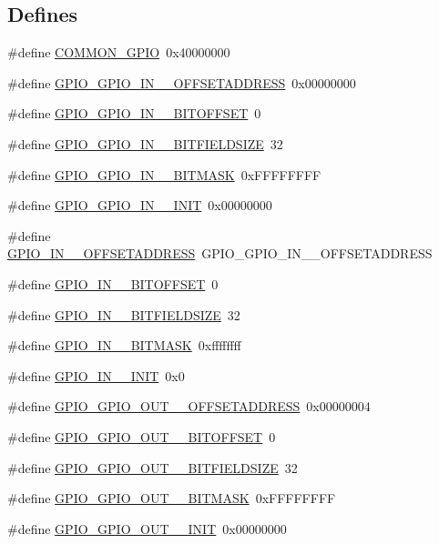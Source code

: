 \subsection*{Defines}
\begin{DoxyCompactItemize}
\item 
\#define \hyperlink{a00553_aacfc134a5216df66d88112b4198b522e}{COMMON\_\-GPIO}~0x40000000
\item 
\#define \hyperlink{a00553_a2e767a84839acf27464ae4a3d6c10e04}{GPIO\_\-GPIO\_\-IN\_\_\-OFFSETADDRESS}~0x00000000
\item 
\#define \hyperlink{a00553_ab8c7701a197c66b2717665c99fe1f8e2}{GPIO\_\-GPIO\_\-IN\_\_\-BITOFFSET}~0
\item 
\#define \hyperlink{a00553_aaaa37fd5f23b4c1d173c7b6ac3ca3895}{GPIO\_\-GPIO\_\-IN\_\_\-BITFIELDSIZE}~32
\item 
\#define \hyperlink{a00553_aed93c86b991e425bf14af327fd2a4a88}{GPIO\_\-GPIO\_\-IN\_\_\-BITMASK}~0xFFFFFFFF
\item 
\#define \hyperlink{a00553_a9f6d23c659623d44079bc940aaffc8ba}{GPIO\_\-GPIO\_\-IN\_\_\-INIT}~0x00000000
\item 
\#define \hyperlink{a00553_a4f8fa50ef8d0c72718d5cf595edb3299}{GPIO\_\-IN\_\_\-OFFSETADDRESS}~GPIO\_\-GPIO\_\-IN\_\_\-OFFSETADDRESS
\item 
\#define \hyperlink{a00553_afd67af3297bbf6800de85cfcae170347}{GPIO\_\-IN\_\_\-BITOFFSET}~0
\item 
\#define \hyperlink{a00553_ab3403b14825d6b6c14a0caaf09107a77}{GPIO\_\-IN\_\_\-BITFIELDSIZE}~32
\item 
\#define \hyperlink{a00553_ad42b97492e9210fb1c26f27ededbc2aa}{GPIO\_\-IN\_\_\-BITMASK}~0xffffffff
\item 
\#define \hyperlink{a00553_aaec9c64dc9aea77a67388f30149fbde3}{GPIO\_\-IN\_\_\-INIT}~0x0
\item 
\#define \hyperlink{a00553_ada0ad17a3107a4db928652912ad0aa25}{GPIO\_\-GPIO\_\-OUT\_\_\-OFFSETADDRESS}~0x00000004
\item 
\#define \hyperlink{a00553_a891709ae120aaa80629974db33665841}{GPIO\_\-GPIO\_\-OUT\_\_\-BITOFFSET}~0
\item 
\#define \hyperlink{a00553_ad60609468520dd5fc0c7343dc9aff6ef}{GPIO\_\-GPIO\_\-OUT\_\_\-BITFIELDSIZE}~32
\item 
\#define \hyperlink{a00553_af8969f771f5bf8d1db5c6fb5e6b892cf}{GPIO\_\-GPIO\_\-OUT\_\_\-BITMASK}~0xFFFFFFFF
\item 
\#define \hyperlink{a00553_afaccbbb4eb3f9a329dcc84c5090586e4}{GPIO\_\-GPIO\_\-OUT\_\_\-INIT}~0x00000000

\end{DoxyCompactItemize}
